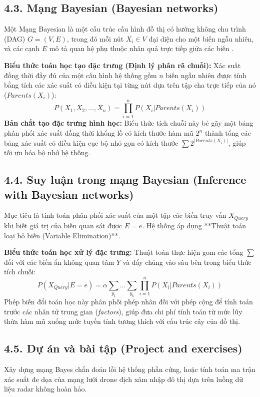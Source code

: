 \documentclass[../main.tex]{subfiles}
\begin{document}
\subsection{4.3. Mạng Bayesian (Bayesian networks)}
Một Mạng Bayesian là một cấu trúc cấu hình đồ thị có hướng không chu trình (DAG) $G=(V,E)$, trong đó mỗi nút $X_i \in V$ đại diện cho một biến ngẫu nhiên, và các cạnh $E$ mô tả quan hệ phụ thuộc nhân quả trực tiếp giữa các biến \cite{mutzari2025defending}.

\textbf{Biểu thức toán học tạo đặc trưng (Định lý phân rã chuỗi):} Xác suất đồng thời đầy đủ của một cấu hình hệ thống gồm $n$ biến ngẫu nhiên được tính bằng tích các xác suất có điều kiện tại từng nút dựa trên tập cha trực tiếp của nó ($Parents(X_i)$):
\begin{equation}
    P(X_1, X_2, ..., X_n) = \prod_{i=1}^{n} P(X_i | Parents(X_i))
\end{equation}
\textbf{Bản chất tạo đặc trưng hình học:} Biểu thức tích chuỗi này bẻ gãy một bảng phân phối xác suất đồng thời khổng lồ có kích thước hàm mũ $2^n$ thành tổng các bảng xác suất có điều kiện cục bộ nhỏ gọn có kích thước $\sum 2^{|Parents(X_i)|}$, giúp tối ưu hóa bộ nhớ hệ thống.

\subsection{4.4. Suy luận trong mạng Bayesian (Inference with Bayesian networks)}
Mục tiêu là tính toán phân phối xác suất của một tập các biến truy vấn $X_{Query}$ khi biết giá trị của biến quan sát được $E = e$. Hệ thống áp dụng **Thuật toán loại bỏ biến (Variable Elimination)**.

\textbf{Biểu thức toán học xử lý đặc trưng:} Thuật toán thực hiện gom các tổng $\sum$ đối với các biến ẩn không quan tâm $Y$ và đẩy chúng vào sâu bên trong biểu thức tích chuỗi:
\begin{equation}
    P(X_{Query} | E = e) = \alpha \sum_{y_1} \dots \sum_{y_k} \prod_{i=1}^{n} P(X_i | Parents(X_i))
\end{equation}
Phép biến đổi toán học này phân phối phép nhân đối với phép cộng để tính toán trước các nhân tử trung gian (\textit{factors}), giúp đưa chi phí tính toán từ mức lũy thừa hàm mũ xuống mức tuyến tính tương thích với cấu trúc cây của đồ thị.

\subsection{4.5. Dự án và bài tập (Project and exercises)}
Xây dựng mạng Bayes chẩn đoán lỗi hệ thống phần cứng, hoặc tính toán ma trận xác suất đe dọa của mạng lưới drone địch xâm nhập đô thị dựa trên luồng dữ liệu radar không hoàn hảo.
\end{document}
